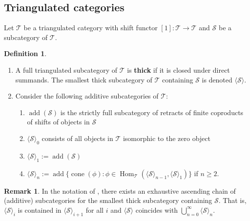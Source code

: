 \documentclass[11pt]{amsart}
\theoremstyle{plain}
\theoremstyle{definition}
\newtheorem{definition}[theorem]{Definition}
\newtheorem{remark}[theorem]{Remark}
\numberwithin{equation}{section}
\numberwithin{theorem}{section}
\begin{document}
\subsection{Triangulated categories}
\label{sec:generation_triangulated}

Let $\mathcal{T}$ be a triangulated category with shift functor $[1]\colon \mathcal{T} \to \mathcal{T}$ and $\mathcal{S}$ be a subcategory of $\mathcal{T}$.

\begin{definition}\label{def:thick_subcategory_triangulated}
    \hfill
    \begin{enumerate}
        \item A full triangulated subcategory of $\mathcal{T}$ is \textbf{thick} if it is closed under direct summands. The smallest thick subcategory of $\mathcal{T}$ containing $\mathcal{S}$ is denoted $\langle \mathcal{S} \rangle$.
        \item Consider the following additive subcategories of $\mathcal{T}$:
        \begin{enumerate}
            \item $\operatorname{add}(\mathcal{S})$ is the strictly full subcategory of retracts of finite coproducts of shifts of objects in $\mathcal{S}$
            \item $\langle \mathcal{S} \rangle_0$ consists of all objects in $\mathcal{T}$ isomorphic to the zero object
            \item $\langle \mathcal{S} \rangle_1 :=\operatorname{add}(\mathcal{S})$
            \item $\langle \mathcal{S} \rangle_n := \operatorname{add}\{ \operatorname{cone}(\phi) : \phi \in \operatorname{Hom}_\mathcal{T} ( \langle \mathcal{S} \rangle_{n-1}, \langle \mathcal{S} \rangle_1) \}$ if $n\geq 2$.
        \end{enumerate}
    \end{enumerate}
\end{definition}

\begin{remark}
    In the notation of , there exists an exhaustive ascending chain of (additive) subcategories for the smallest thick subcategory containing $\mathcal{S}$. That is, $\langle \mathcal{S} \rangle_i$ is contained in $\langle \mathcal{S} \rangle_{i+1}$ for all $i$ and $\langle \mathcal{S} \rangle$ coincides with $\bigcup^{\infty}_{n=0} \langle \mathcal{S} \rangle_n$.
\end{remark}
\end{document}
